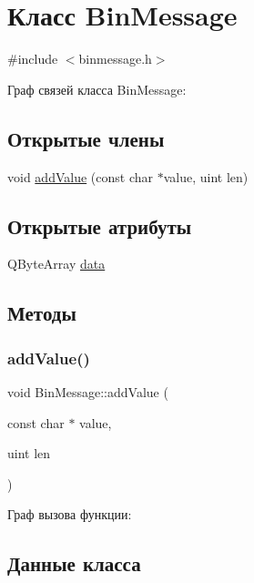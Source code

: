 \hypertarget{class_bin_message}{}\section{Класс Bin\+Message}
\label{class_bin_message}


{\ttfamily \#include $<$binmessage.\+h$>$}



Граф связей класса Bin\+Message\+:
\subsection*{Открытые члены}
\begin{DoxyCompactItemize}
\item 
void \hyperlink{class_bin_message_a47cc1e9c538f05361522883989ec3d96}{add\+Value} (const char $\ast$value, uint len)
\end{DoxyCompactItemize}
\subsection*{Открытые атрибуты}
\begin{DoxyCompactItemize}
\item 
Q\+Byte\+Array \hyperlink{class_bin_message_a697ee2fc45eb0338db77ddff953db400}{data}
\end{DoxyCompactItemize}


\subsection{Методы}
\mbox{\label{class_bin_message_a47cc1e9c538f05361522883989ec3d96}} 
\subsubsection{\texorpdfstring{add\+Value()}{addValue()}}
{\footnotesize\ttfamily void Bin\+Message\+::add\+Value (\begin{DoxyParamCaption}\item[{const char $\ast$}]{value,  }\item[{uint}]{len }\end{DoxyParamCaption})}

Граф вызова функции\+:


\subsection{Данные класса}
\mbox{\label{class_bin_message_a697ee2fc45eb0338db77ddff953db400}} 
